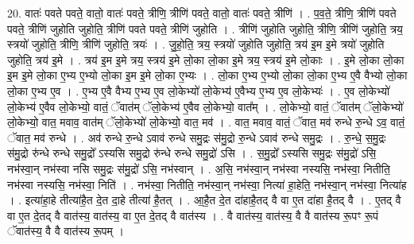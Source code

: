 \documentclass[17pt]{extarticle}
\begin{document}
20. वातः॑ पवते पवते॒ वातो॒ वातः॑ पवते॒ त्रीणि॒ त्रीणि॑ पवते॒ वातो॒ वातः॑ पवते॒ त्रीणि॑ । . प॒व॒ते॒ त्रीणि॒ त्रीणि॑ पवते पवते॒ त्रीणि॑ जुहोति जुहोति॒ त्रीणि॑ पवते पवते॒ त्रीणि॑ जुहोति । . त्रीणि॑ जुहोति जुहोति॒ त्रीणि॒ त्रीणि॑ जुहोति॒ त्रय॒ स्त्रयो॑ जुहोति॒ त्रीणि॒ त्रीणि॑ जुहोति॒ त्रयः॑ । . जु॒हो॒ति॒ त्रय॒ स्त्रयो॑ जुहोति जुहोति॒ त्रय॑ इ॒म इ॒मे त्रयो॑ जुहोति जुहोति॒ त्रय॑ इ॒मे । . त्रय॑ इ॒म इ॒मे त्रय॒ स्त्रय॑ इ॒मे लो॒का लो॒का इ॒मे त्रय॒ स्त्रय॑ इ॒मे लो॒काः । . इ॒मे लो॒का लो॒का इ॒म इ॒मे लो॒का ए॒भ्य ए॒भ्यो लो॒का इ॒म इ॒मे लो॒का ए॒भ्यः । . लो॒का ए॒भ्य ए॒भ्यो लो॒का लो॒का ए॒भ्य ए॒वै वैभ्यो लो॒का लो॒का ए॒भ्य ए॒व । . ए॒भ्य ए॒वै वैभ्य ए॒भ्य ए॒व लो॒केभ्यो॑ लो॒केभ्य॑ ए॒वैभ्य ए॒भ्य ए॒व लो॒केभ्यः॑ । . ए॒व लो॒केभ्यो॑ लो॒केभ्य॑ ए॒वैव लो॒केभ्यो॒ वातं॒ ॅवात॑म् ॅलो॒केभ्य॑ ए॒वैव लो॒केभ्यो॒ वात᳚म् । . लो॒केभ्यो॒ वातं॒ ॅवात॑म् ॅलो॒केभ्यो॑ लो॒केभ्यो॒ वात॒ मवाव॒ वात॑म् ॅलो॒केभ्यो॑ लो॒केभ्यो॒ वात॒ मव॑ । . वात॒ मवाव॒ वातं॒ ॅवात॒ मव॑ रुन्धे रु॒न्धे ऽव॒ वातं॒ ॅवात॒ मव॑ रुन्धे । . अव॑ रुन्धे रु॒न्धे ऽवाव॑ रुन्धे समु॒द्रः स॑मु॒द्रो रु॒न्धे ऽवाव॑ रुन्धे समु॒द्रः । . रु॒न्धे॒ स॒मु॒द्रः स॑मु॒द्रो रु॑न्धे रुन्धे समु॒द्रो᳚ ऽस्यसि समु॒द्रो रु॑न्धे रुन्धे समु॒द्रो॑ ऽसि । . स॒मु॒द्रो᳚ ऽस्यसि समु॒द्रः स॑मु॒द्रो॑ ऽसि॒ नभ॑स्वा॒न् नभ॑स्वा नसि समु॒द्रः स॑मु॒द्रो॑ ऽसि॒ नभ॑स्वान् । . अ॒सि॒ नभ॑स्वा॒न् नभ॑स्वा नस्यसि॒ नभ॑स्वा॒ नितीति॒ नभ॑स्वा नस्यसि॒ नभ॑स्वा॒ निति॑ । . नभ॑स्वा॒ नितीति॒ नभ॑स्वा॒न् नभ॑स्वा॒ नित्या॑ हा॒हेति॒ नभ॑स्वा॒न् नभ॑स्वा॒ नित्या॑ह । . इत्या॑हा॒हे तीत्या॑है॒त दे॒त दा॒हे तीत्या॑ है॒तत् । . आ॒है॒त दे॒त दा॑हाहै॒तद् वै वा ए॒त दा॑हा है॒तद् वै । . ए॒तद् वै वा ए॒त दे॒तद् वै वात॑स्य॒ वात॑स्य॒ वा ए॒त दे॒तद् वै वात॑स्य । . वै वात॑स्य॒ वात॑स्य॒ वै वै वात॑स्य रू॒पꣳ रू॒पं ॅवात॑स्य॒ वै वै वात॑स्य रू॒पम् । \newline
\end{document}

